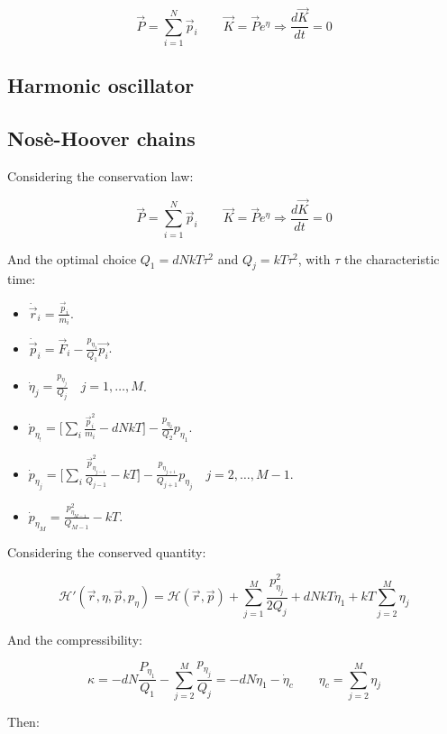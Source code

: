 	$$\vec{P} = \sum\limits_{i=1}^N\vec{p}_i\qquad \vec{K} = \vec{P}e^\eta\Rightarrow \frac{d\vec{K}}{d t} = 0$$

	\subsection{Harmonic oscillator}

	\subsection{Nos\`e-Hoover chains}
	Considering the conservation law:

	$$\vec{P} = \sum\limits_{i=1}^N\vec{p}_i\qquad \vec{K} = \vec{P}e^\eta\Rightarrow \frac{d\vec{K}}{d t} = 0$$

	And the optimal choice $Q_1 = dNkT\tau^2$ and $Q_j = kT\tau^2$, with $\tau$ the characteristic time:

	\begin{multicols}{2}
		\begin{itemize}
			\item $\dot{\vec{r}}_i = \frac{\vec{p}_i}{m_i}$.
			\item $\dot{\vec{p}}_i = \vec{F}_i - \frac{p_{\eta_1}}{Q_1}\vec{p_i}$.
			\item $\dot{\eta}_j = \frac{p_{\eta_j}}{Q_j}\quad j = 1, \dots, M$.
			\item $\dot{p}_{\eta_!} = \biggl[\sum\limits_i\frac{\vec{p}_i^2}{m_i}-dNkT\biggr] - \frac{p_{\eta_2}}{Q_2}p_{\eta_1}$.
			\item $\dot{p}_{\eta_j} = \biggl[\sum\limits_i\frac{\vec{p}_{\eta_{j-1}}^2}{Q_{j-1}}-kT\biggr] - \frac{p_{\eta_{j+1}}}{Q_{j+1}}p_{\eta_j}\quad j = 2, \dots, M-1$.
			\item $\dot{p}_{\eta_M} = \frac{p^2_{\eta_{M-1}}}{Q_{M-1}}-kT$.
		\end{itemize}
	\end{multicols}

	Considering the conserved quantity:

	$$\mathcal{H}'(\vec{r}, \eta, \vec{p}, p_\eta) = \mathcal{H}(\vec{r}, \vec{p}) + \sum\limits_{j=1}^M\frac{p_{\eta_j}^2}{2Q_j} + dNkT\eta_1 + kT\sum\limits_{j=2}^M\eta_j$$

	And the compressibility:

	$$\kappa = -dN\frac{P_{\eta_1}}{Q_1} - \sum\limits_{j=2}^M\frac{p_{\eta_j}}{Q_j} = -dN\dot{\eta}_1 - \dot{\eta}_c\qquad \eta_c = \sum\limits_{j=2}^M\eta_j$$

	Then:

